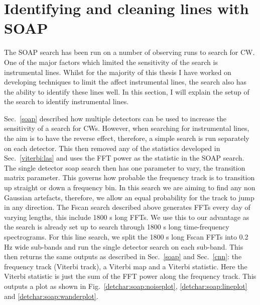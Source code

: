 \section{\label{detchar:soap}Identifying and cleaning lines with SOAP}

The SOAP search has been run on a number of observing runs to search for \ac{CW}. 
One of the major factors which limited the sensitivity of the search is instrumental lines. 
Whilst for the majority of this thesis I have worked on developing techniques to limit the affect instrumental lines, the search also has the ability to identify these lines well.
In this section, I will explain the setup of the search to identify instrumental lines.

Sec.~\ref{soap} described how multiple detectors can be used to increase the sensitivity of a search for \acp{CW}. 
However, when searching for instrumental lines, the aim is to have the reverse effect, therefore, a simple search is run separately on each detector. 
This then removed any of the statistics developed in Sec.~\ref{viterbi:las} and uses the \ac{FFT} power as the statistic in the SOAP search.
The single detector soap search then has one parameter to vary, the transition matrix parameter. 
This governs how probable the frequency track is to transition up straight or down a frequency bin.
In this search we are aiming to find any non Gaussian artefacts, therefore, we allow an equal probability for the track to jump in any direction. 
The Fscan search described above generates \acp{FFT} every day of varying lengths, this include 1800 s long \acp{FFT}. 
We use this to our advantage as the search is already set up to search through 1800 s long time-frequency spectrograms. 
For this line search, we split the 1800 s long Fscan \acp{FFT} into 0.2 Hz wide sub-bands and run the single detector search on each sub-band. 
This then returns the same outputs as described in Sec.~\ref{soap} and Sec.~\ref{cnn}: the frequency track (Viterbi track), a Viterbi map and a Viterbi statistic. 
Here the Viterbi statistic is just the sum of the \ac{FFT} power along the frequency track. 
This outputs a plot as shown in Fig.~\ref{detchar:soap:noiseplot}, \ref{detchar:soap:lineplot} and \ref{detchar:soap:wanderplot}.

